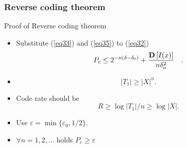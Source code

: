 \documentclass[14pt]{beamer}
\begin{document}
\begin{frame}
\frametitle{Reverse coding theorem}
Proof of Reverse coding theorem
\begin{itemize}

    \item Substitute (\ref{eq33}) and (\ref{eq35}) to (\ref{eq32})
    \begin{equation}
    \label{eq36}
    P_c \le 2^{ - n(\delta - \delta _0 )} + \frac{{\rm {\bf D}}\left[ {I(x)}
    \right]}{n\delta _o^2 } \quad .
    \end{equation}

    \item 
    \[
    \vert T_1 \vert \ge { \vert X \vert}^n.
    \]

    \item Code rate should be
    \begin{equation}
    R \geq  \log \vert T_1 \vert /n \geq \log\vert X \vert.
    \label{eq361}
    \end{equation}

    \item Use $\varepsilon = \min \{\varepsilon_0 ,1 / 2\}.$ 
    
    \item $\forall n = 1,2,...$ holds $P_e \ge \varepsilon $
    
\end{itemize}
\end{frame}

\end{document}
